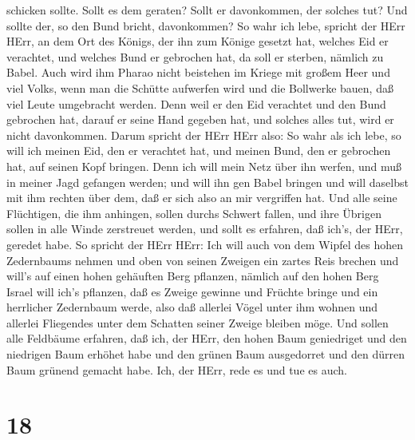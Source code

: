 schicken sollte. Sollt es dem geraten? Sollt er davonkommen, der solches
tut? Und sollte der, so den Bund bricht, davonkommen?  So
wahr ich lebe, spricht der HErr HErr, an dem Ort des Königs, der ihn zum
Könige gesetzt hat, welches Eid er verachtet, und welches Bund er
gebrochen hat, da soll er sterben, nämlich zu Babel.  Auch
wird ihm Pharao nicht beistehen im Kriege mit großem Heer und viel
Volks, wenn man die Schütte aufwerfen wird und die Bollwerke bauen, daß
viel Leute umgebracht werden.  Denn weil er den Eid
verachtet und den Bund gebrochen hat, darauf er seine Hand gegeben hat,
und solches alles tut, wird er nicht davonkommen.  Darum
spricht der HErr HErr also: So wahr als ich lebe, so will ich meinen
Eid, den er verachtet hat, und meinen Bund, den er gebrochen hat, auf
seinen Kopf bringen.  Denn ich will mein Netz über ihn
werfen, und muß in meiner Jagd gefangen werden; und will ihn gen Babel
bringen und will daselbst mit ihm rechten über dem, daß er sich also an
mir vergriffen hat.  Und alle seine Flüchtigen, die ihm
anhingen, sollen durchs Schwert fallen, und ihre Übrigen sollen in alle
Winde zerstreuet werden, und sollt es erfahren, daß ich's, der HErr,
geredet habe.  So spricht der HErr HErr: Ich will auch von
dem Wipfel des hohen Zedernbaums nehmen und oben von seinen Zweigen ein
zartes Reis brechen und will's auf einen hohen gehäuften Berg pflanzen,
 nämlich auf den hohen Berg Israel will ich's pflanzen, daß
es Zweige gewinne und Früchte bringe und ein herrlicher Zedernbaum
werde, also daß allerlei Vögel unter ihm wohnen und allerlei Fliegendes
unter dem Schatten seiner Zweige bleiben möge.  Und sollen
alle Feldbäume erfahren, daß ich, der HErr, den hohen Baum geniedriget
und den niedrigen Baum erhöhet habe und den grünen Baum ausgedorret und
den dürren Baum grünend gemacht habe. Ich, der HErr, rede es und tue es
auch.

\hypertarget{section-17}{%
\section{18}\label{section-17}}


